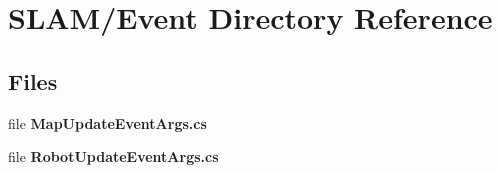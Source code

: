 \section{S\-L\-A\-M/\-Event Directory Reference}
\label{dir_04677f67ac7fbd78fa5aacbce397878b}
\subsection*{Files}
\begin{DoxyCompactItemize}
\item 
file {\bf Map\-Update\-Event\-Args.\-cs}
\item 
file {\bf Robot\-Update\-Event\-Args.\-cs}
\end{DoxyCompactItemize}
